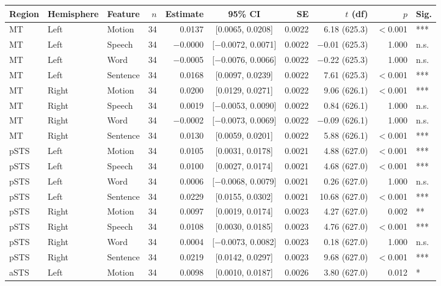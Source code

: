 \begin{table}[h]
\centering
\begin{tabular}{lllrrcrrrl}
\toprule
Region & Hemisphere & Feature & $n$ & Estimate & 95\% CI & SE & $t$ (df) & $p$ & Sig. \\
\midrule
MT & Left & Motion & 34 & 0.0137 & [0.0065, 0.0208] & 0.0022 & 6.18 (625.3) & $<$0.001 & *** \\
MT & Left & Speech & 34 & $-$0.0000 & [$-$0.0072, 0.0071] & 0.0022 & $-$0.01 (625.3) & 1.000 & n.s. \\
MT & Left & Word & 34 & $-$0.0005 & [$-$0.0076, 0.0066] & 0.0022 & $-$0.22 (625.3) & 1.000 & n.s. \\
MT & Left & Sentence & 34 & 0.0168 & [0.0097, 0.0239] & 0.0022 & 7.61 (625.3) & $<$0.001 & *** \\
MT & Right & Motion & 34 & 0.0200 & [0.0129, 0.0271] & 0.0022 & 9.06 (626.1) & $<$0.001 & *** \\
MT & Right & Speech & 34 & 0.0019 & [$-$0.0053, 0.0090] & 0.0022 & 0.84 (626.1) & 1.000 & n.s. \\
MT & Right & Word & 34 & $-$0.0002 & [$-$0.0073, 0.0069] & 0.0022 & $-$0.09 (626.1) & 1.000 & n.s. \\
MT & Right & Sentence & 34 & 0.0130 & [0.0059, 0.0201] & 0.0022 & 5.88 (626.1) & $<$0.001 & *** \\
pSTS & Left & Motion & 34 & 0.0105 & [0.0031, 0.0178] & 0.0021 & 4.88 (627.0) & $<$0.001 & *** \\
pSTS & Left & Speech & 34 & 0.0100 & [0.0027, 0.0174] & 0.0021 & 4.68 (627.0) & $<$0.001 & *** \\
pSTS & Left & Word & 34 & 0.0006 & [$-$0.0068, 0.0079] & 0.0021 & 0.26 (627.0) & 1.000 & n.s. \\
pSTS & Left & Sentence & 34 & 0.0229 & [0.0155, 0.0302] & 0.0021 & 10.68 (627.0) & $<$0.001 & *** \\
pSTS & Right & Motion & 34 & 0.0097 & [0.0019, 0.0174] & 0.0023 & 4.27 (627.0) & 0.002 & ** \\
pSTS & Right & Speech & 34 & 0.0108 & [0.0030, 0.0185] & 0.0023 & 4.76 (627.0) & $<$0.001 & *** \\
pSTS & Right & Word & 34 & 0.0004 & [$-$0.0073, 0.0082] & 0.0023 & 0.18 (627.0) & 1.000 & n.s. \\
pSTS & Right & Sentence & 34 & 0.0219 & [0.0142, 0.0297] & 0.0023 & 9.68 (627.0) & $<$0.001 & *** \\
aSTS & Left & Motion & 34 & 0.0098 & [0.0010, 0.0187] & 0.0026 & 3.80 (627.0) & 0.012 & * \\

\end{tabular}
\end{table}

